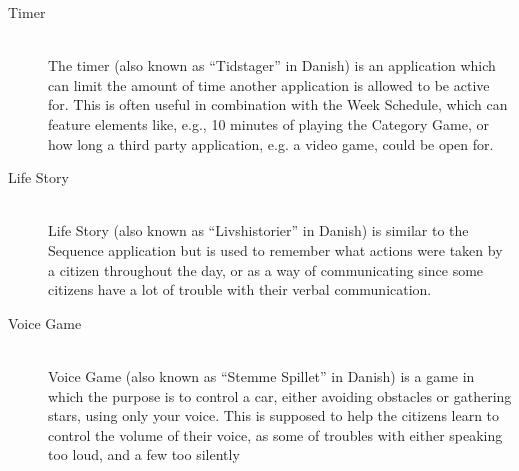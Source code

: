 \begin{description}
	\item[Timer] \hfill \\
	The timer (also known as ``Tidstager'' in Danish) is an application which can limit the amount of time another application is allowed to be active for. 
	This is often useful in combination with the Week Schedule, which can feature elements like, e.g., 10 minutes of playing the Category Game, or how long a third party application, e.g. a video game, could be open for.
	\item[Life Story] \hfill \\
	Life Story (also known as ``Livshistorier'' in Danish) is similar to the Sequence application but is used to remember what actions were taken by a citizen throughout the day, or as a way of communicating since some citizens have a lot of trouble with their verbal communication.
	\item[Voice Game] \hfill \\
	Voice Game (also known as ``Stemme Spillet'' in Danish) is a game in which the purpose is to control a car, either avoiding obstacles or gathering stars, using only your voice.
	This is supposed to help the citizens learn to control the volume of their voice, as some of troubles with either speaking too loud, and a few too silently
\end{description}
